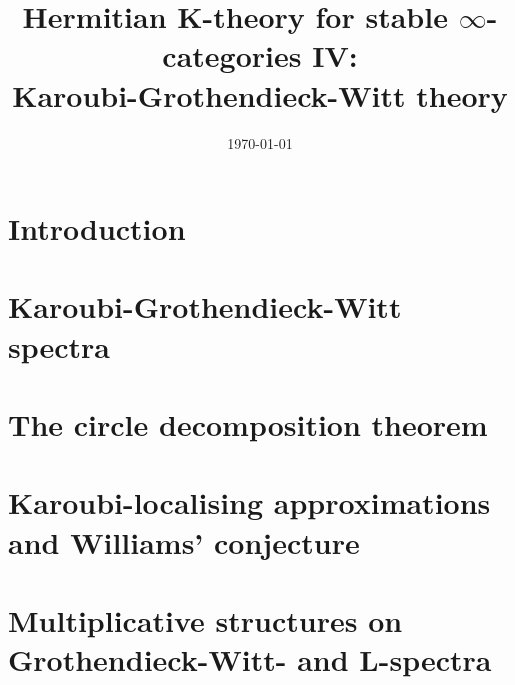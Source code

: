 \documentclass[10pt]{amsart}
\title[Hermitian K-theory for stable $\infty$-categories IV: Karoubi-Grothendieck-Witt theory]{Hermitian K-theory for stable $\infty$-categories IV:\\
Karoubi-Grothendieck-Witt theory}
\date{\today}
\begin{document}
\begin{abstract}

\end{abstract}

\maketitle
\tableofcontents


\section*{Introduction}





\medskip




\section{Karoubi-Grothendieck-Witt spectra}
\label{section:localising}%


\section{The circle decomposition theorem}
\label{section:shaneson}%


\section{Karoubi-localising approximations and Williams' conjecture}
\label{section:karoubification}%


\section{Multiplicative structures on Grothendieck-Witt- and L-spectra}
\label{section:day}%

\end{document}
